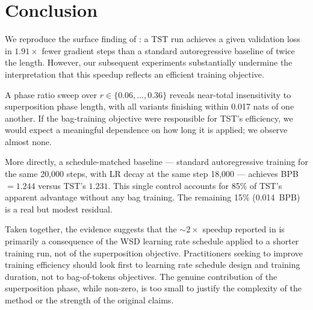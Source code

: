 \documentclass{article}
\begin{document}
\section{Conclusion}

We reproduce the surface finding of \citet{peng2026efficient}: a TST run achieves a
given validation loss in $1.91\times$ fewer gradient steps than a standard
autoregressive baseline of twice the length.
However, our subsequent experiments substantially undermine the interpretation that
this speedup reflects an efficient training objective.

A phase ratio sweep over $r \in \{0.06, \ldots, 0.36\}$ reveals near-total
insensitivity to superposition phase length, with all variants finishing within
0.017 nats of one another.
If the bag-training objective were responsible for TST's efficiency, we would expect
a meaningful dependence on how long it is applied; we observe almost none.

More directly, a schedule-matched baseline — standard autoregressive training for the
same 20{,}000 steps, with LR decay at the same step 18{,}000 — achieves BPB~$= 1.244$
versus TST's $1.231$.
This single control accounts for 85\% of TST's apparent advantage without any
bag training.
The remaining 15\% (0.014~BPB) is a real but modest residual.

Taken together, the evidence suggests that the $\sim$$2\times$ speedup reported in
\citet{peng2026efficient} is primarily a consequence of the WSD learning rate schedule
applied to a shorter training run, not of the superposition objective.
Practitioners seeking to improve training efficiency should look first to learning
rate schedule design and training duration, not to bag-of-tokens objectives.
The genuine contribution of the superposition phase, while non-zero, is too small to
justify the complexity of the method or the strength of the original claims.


\end{document}

